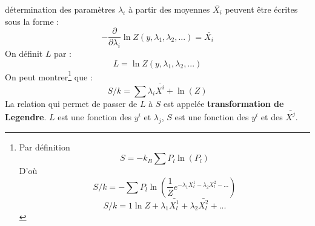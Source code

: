 \documentclass[12pt]{book}
\begin{document}
d\'etermination des param\`etres $\lambda_i$ \`a partir des moyennes
$\bar{X_i}$ peuvent \^etre \'ecrites sous la forme :
\begin{equation}
-\frac{\partial}{\partial \lambda_i}\ln Z(y,\lambda_1,\lambda_2,...) =
\bar{X_i} 
\end{equation}
On d\'efinit $L$ par :
\begin{equation}
L=\ln Z(y,\lambda_1,\lambda_2,...)
\end{equation}
On peut montrer\footnote{Par d\'efinition
\begin{equation}
S=-k_B\sum P_l \ln (P_l)
\end{equation}
D'o\`u
\begin{equation}
S/k=-\sum P_l\ln(\frac{1}{Z}e^{-\lambda_1 X^{1}_l-\lambda_2 X^{2}_l- ...})
\end{equation}
\begin{equation}
S/k=1\ln Z+\lambda_1 \bar{X^{1}_l}+\lambda_2 \bar{X^{2}_l}+ ...
\end{equation}
} que :
\begin{equation}
S/k=\sum \lambda_i \bar{X^i}+\ln(Z)
\end{equation}
La relation qui permet de passer de $L$ \`a $S$ est appel\'ee {\bf
transformation de Legendre}.
$L$ est une fonction des $y^i$ et $\lambda_j$, $S$ est une fonction
des $ y^i$ et des $\bar{X^j}$.
\end{document}
